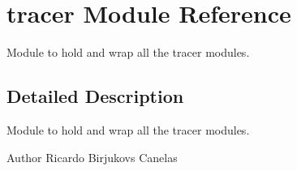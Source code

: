 \hypertarget{namespacetracer}{}\section{tracer Module Reference}
\label{namespacetracer}


Module to hold and wrap all the tracer modules.  




\subsection{Detailed Description}
Module to hold and wrap all the tracer modules. 

\begin{DoxyAuthor}{Author}
Ricardo Birjukovs Canelas 
\end{DoxyAuthor}
